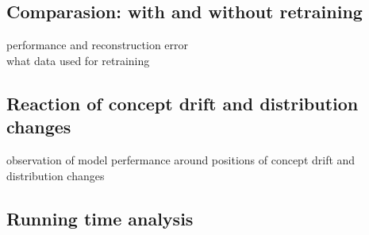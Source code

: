 \subsection{Comparasion: with and without retraining}
\label{sec: compare}

performance and reconstruction error\\
what data used for retraining


\subsection{Reaction of concept drift and distribution changes}
\label{sec:reaction}
observation of model perfermance around positions of concept drift and distribution changes 

\subsection{Running time analysis}
\label{sec:time}




